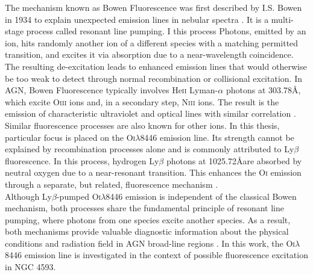 The mechanism known as Bowen Fluorescence was first described by I.S. Bowen in 1934 to explain unexpected emission lines in nebular spectra \parencite{bowen1934}. It is a multi-stage process called resonant line pumping. I this process Photons, emitted by an ion, hits randomly another ion of a different species with a matching permitted transition, and excites it via absorption due to a near-wavelength coincidence. The resulting de-excitation leads to enhanced emission lines that would otherwise be too weak to detect through normal recombination or collisional excitation. In AGN, Bowen Fluorescence typically involves He\textsc{ii} Lyman-$\alpha$ photons at 303.78\AA, which excite O\textsc{iii} ions and, in a secondary step, N\textsc{iii} ions. The result is the emission of characteristic ultraviolet and optical lines with similar correlation \parencite{selvelli2007, baldini2023}.\\
Similar fluorescence processes are also known for other ions. In this thesis, particular focus is placed on the O\textsc{i}$\lambda$8446 emission line. Its strength cannot be explained by recombination processes alone and is commonly attributed to Ly$\beta$ fluorescence. In this process, hydrogen Ly$\beta$ photons at 1025.72\AA are absorbed by neutral oxygen due to a near-resonant transition. This enhances the O\textsc{i} emission through a separate, but related, fluorescence mechanism \parencite{grandi1980}.\\
Although Ly$\beta$-pumped O\textsc{i}$\lambda$8446 emission is independent of the classical Bowen mechanism, both processes share the fundamental principle of resonant line pumping, where photons from one species excite another species. As a result, both mechanisms provide valuable diagnostic information about the physical conditions and radiation field in AGN broad-line regions \parencite{grandi1980, selvelli2007}. In this work, the O\textsc{i}$\lambda$8446 emission line is investigated in the context of possible fluorescence excitation in NGC 4593.





